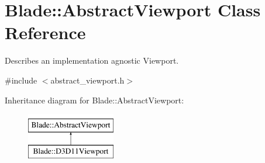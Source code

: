 \hypertarget{class_blade_1_1_abstract_viewport}{}\section{Blade\+:\+:Abstract\+Viewport Class Reference}
\label{class_blade_1_1_abstract_viewport}


Describes an implementation agnostic Viewport.  




{\ttfamily \#include $<$abstract\+\_\+viewport.\+h$>$}

Inheritance diagram for Blade\+:\+:Abstract\+Viewport\+:\begin{figure}[H]
\begin{center}
\leavevmode
\includegraphics[height=2.000000cm]{class_blade_1_1_abstract_viewport}
\end{center}
\end{figure}
